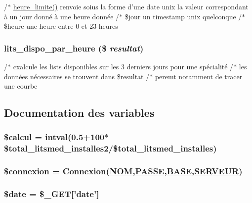 /$\ast$ \hyperlink{lits__dispo_8php_a8}{heure\_\-limite()} renvoie soius la forme d'une date unix la valeur correspondant \`{a} un jour donn\'{e} \`{a} une heure donn\'{e}e /$\ast$ \$jour un timestamp unix quelconque /$\ast$ \$heure une heure entre 0 et 23 heures \hypertarget{lits__dispo_8php_a9}{
\subsubsection[lits\_\-dispo\_\-par\_\-heure]{\setlength{\rightskip}{0pt plus 5cm}lits\_\-dispo\_\-par\_\-heure (\$ {\em resultat})}}
\label{lits__dispo_8php_a9}


/$\ast$ cxalcule les lists disponibles sur les 3 derniers jours pour une sp\'{e}cialit\'{e} /$\ast$ les donn\'{e}es n\'{e}cessaires se trouvent dans \$resultat /$\ast$ peremt notamment de tracer une courbe 

\subsection{Documentation des variables}
\hypertarget{lits__dispo_8php_a7}{
\subsubsection[\$calcul]{\setlength{\rightskip}{0pt plus 5cm}\$calcul = intval(0.5+100$\ast$\$total\_\-litsmed\_\-installes2/\$total\_\-litsmed\_\-installes)}}
\label{lits__dispo_8php_a7}


\hypertarget{lits__dispo_8php_a1}{
\subsubsection[\$connexion]{\setlength{\rightskip}{0pt plus 5cm}\$connexion = Connexion(\hyperlink{pma__connect_8php_a0}{NOM},\hyperlink{pma__connect_8php_a1}{PASSE},\hyperlink{pma__connect_8php_a3}{BASE},\hyperlink{pma__connect_8php_a2}{SERVEUR})}}
\label{lits__dispo_8php_a1}


\hypertarget{lits__dispo_8php_a3}{
\subsubsection[\$date]{\setlength{\rightskip}{0pt plus 5cm}\$date = \$\_\-GET\mbox{[}'date'\mbox{]}}}
\label{lits__dispo_8php_a3}


